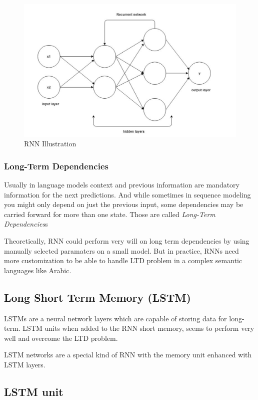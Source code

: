 \begin{figure}[ht]
    \centering
    \includegraphics[scale=0.3]{Images/recurrent-nets.png}
    \caption{RNN Illustration}
    \label{fig:rnnI}
\end{figure}


\subsubsection{Long-Term Dependencies}

Usually in language models context and previous information are mandatory information for the next predictions. And while sometimes in sequence modeling you might only depend on just the previous input, some dependencies may be carried forward for more than one state. Those are called \textit{Long-Term Dependencies}s

Theoretically, RNN could perform very will on long term dependencies by using manually selected paramaters on a small model. But in practice, RNNs need more customization to be able to handle LTD problem in a complex semantic languages like Arabic.

\subsection{Long Short Term Memory (LSTM)}

LSTMs are a neural network layers which are capable of storing data for long-term. LSTM units when added to the RNN short memory, seems to perform very well and overcome the LTD problem.

LSTM networks are a special kind of RNN with the memory unit enhanced with LSTM layers.

\subsection{LSTM unit}

